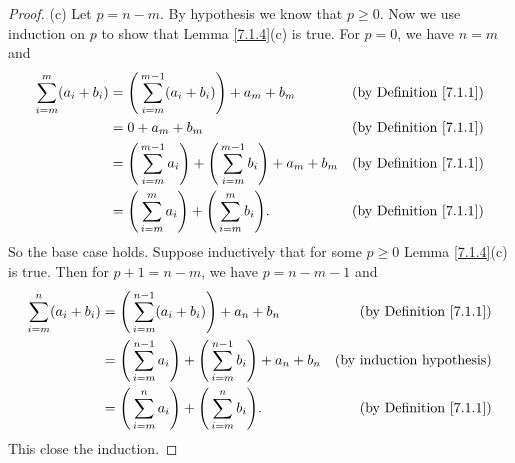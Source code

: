 \begin{proof}{(c)}
    Let \(p = n - m\).
    By hypothesis we know that \(p \geq 0\).
    Now we use induction on \(p\) to show that Lemma \ref{7.1.4}(c) is true.
    For \(p = 0\), we have \(n = m\) and
    \begin{align*}
        \sum_{i = m}^m (a_i + b_i) & = \Bigg(\sum_{i = m}^{m - 1} (a_i + b_i)\Bigg) + a_m + b_m                                & \text{(by Definition \ref{7.1.1})} \\
                                   & = 0 + a_m + b_m                                                                           & \text{(by Definition \ref{7.1.1})} \\
                                   & = \Bigg(\sum_{i = m}^{m - 1} a_i\Bigg) + \Bigg(\sum_{i = m}^{m - 1} b_i\Bigg) + a_m + b_m & \text{(by Definition \ref{7.1.1})} \\
                                   & = \Bigg(\sum_{i = m}^m a_i\Bigg) + \Bigg(\sum_{i = m}^m b_i\Bigg).                        & \text{(by Definition \ref{7.1.1})}
    \end{align*}
    So the base case holds.
    Suppose inductively that for some \(p \geq 0\) Lemma \ref{7.1.4}(c) is true.
    Then for \(p + 1 = n - m\), we have \(p = n - m - 1\) and
    \begin{align*}
        \sum_{i = m}^n (a_i + b_i) & = \Bigg(\sum_{i = m}^{n - 1} (a_i + b_i)\Bigg) + a_n + b_n                                & \text{(by Definition \ref{7.1.1})} \\
                                   & = \Bigg(\sum_{i = m}^{n - 1} a_i\Bigg) + \Bigg(\sum_{i = m}^{n - 1} b_i\Bigg) + a_n + b_n & \text{(by induction hypothesis)}   \\
                                   & = \Bigg(\sum_{i = m}^n a_i\Bigg) + \Bigg(\sum_{i = m}^n b_i\Bigg).                        & \text{(by Definition \ref{7.1.1})}
    \end{align*}
    This close the induction.
\end{proof}

